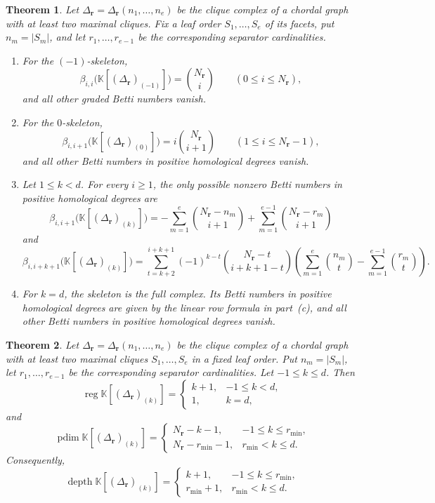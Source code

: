 \documentclass[10pt,a4paper]{amsart}
\newtheorem{theorem}{Theorem}
\newcommand{\K}{\mathbb K}
\newcommand{\SR}[1]{\K[#1]}
\DeclareMathOperator{\pdim}{pdim}
\DeclareMathOperator{\reg}{reg}
\begin{document}
	\begin{theorem}\label{thm:1}
		Let $\Delta_{\mathbf r}=\Delta_{\mathbf r}(n_1,\ldots,n_e)$ be the clique complex of a chordal graph with at least two maximal cliques. Fix a leaf order $S_1,\ldots,S_e$ of its facets, put $n_m=|S_m|$, and let $r_1,\ldots,r_{e-1}$ be the corresponding separator cardinalities.
		\begin{enumerate}
			\item[(a)] For the $(-1)$-skeleton,
			\[
			\beta_{i,i}\bigl(\SR{(\Delta_{\mathbf r})_{(-1)}}\bigr)=\binom{N_{\mathbf r}}i
			\qquad(0\le i\le N_{\mathbf r}),
			\]
			and all other graded Betti numbers vanish.
			
			\item[(b)] For the $0$-skeleton,
			\[
			\beta_{i,i+1}\bigl(\SR{(\Delta_{\mathbf r})_{(0)}}\bigr)
			=i\binom{N_{\mathbf r}}{i+1}
			\qquad(1\le i\le N_{\mathbf r}-1),
			\]
			and all other Betti numbers in positive homological degrees vanish.
			
			\item[(c)] Let $1\le k<d$. For every $i\ge1$, the only possible nonzero Betti numbers in positive homological degrees are
			\[
			\beta_{i,i+1}\bigl(\SR{(\Delta_{\mathbf r})_{(k)}}\bigr)
			=
			-\sum_{m=1}^e\binom{N_{\mathbf r}-n_m}{i+1}
			+\sum_{m=1}^{e-1}\binom{N_{\mathbf r}-r_m}{i+1}
			\]
			and
			\[
			\beta_{i,i+k+1}\bigl(\SR{(\Delta_{\mathbf r})_{(k)}}\bigr)
			=
			\sum_{t=k+2}^{i+k+1}
			(-1)^{k-t}
			\binom{N_{\mathbf r}-t}{i+k+1-t}
			\left(
			\sum_{m=1}^e\binom{n_m}{t}
			-
			\sum_{m=1}^{e-1}\binom{r_m}{t}
			\right).
			\]
			
			\item[(d)] For $k=d$, the skeleton is the full complex. Its Betti numbers in positive homological degrees are given by the linear row formula in part~(c), and all other Betti numbers in positive homological degrees vanish.
		\end{enumerate}
	\end{theorem}

	\begin{theorem}\label{thm:2}
		Let $\Delta_{\mathbf r}=\Delta_{\mathbf r}(n_1,\ldots,n_e)$ be the clique complex of a chordal graph with at least two maximal cliques $S_1,\ldots,S_e$ in a fixed leaf order. Put $n_m=|S_m|$, let $r_1,\ldots,r_{e-1}$ be the corresponding separator cardinalities.
		Let $-1\le k\le d$. Then
		\[
		\reg\SR{(\Delta_{\mathbf r})_{(k)}}
		=
		\begin{cases}
			k+1,&-1\le k<d,\\
			1,&k=d,
		\end{cases}
		\]
		and
		\[
		\pdim\SR{(\Delta_{\mathbf r})_{(k)}}
		=
		\begin{cases}
			N_{\mathbf r}-k-1,&-1\le k\le r_{\min},\\
			N_{\mathbf r}-r_{\min}-1,&r_{\min}<k\le d.
		\end{cases}
		\]
		Consequently,
		\[
		\operatorname{depth}\SR{(\Delta_{\mathbf r})_{(k)}}
		=
		\begin{cases}
			k+1,&-1\le k\le r_{\min},\\
			r_{\min}+1,&r_{\min}<k\le d.
		\end{cases}
		\]
	\end{theorem}
\end{document}
